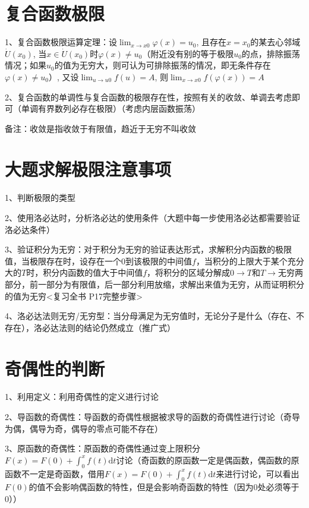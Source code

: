 \section{复合函数极限}

1、复合函数极限运算定理：设$\lim_{x \rightarrow x{0}} \varphi(x)=u_{0}$, 且存在$x=x_{0}$的某去心邻域$\dot{U}\left(x_{0}\right)$, 当$x \in \dot{U}\left(x_{0}\right)$时$\varphi(x) \neq u_{0}$（附近没有别的等于极限$u_{0}$的点，排除振荡情况；如果$u_{0}$的值为无穷大，则可认为可排除振荡的情况，即无条件存在$\varphi(x) \neq u_{0}$）, 又设$\lim_{u \rightarrow u{0}} f(u)=A$, 则$\lim_{x \rightarrow x{0}} f(\varphi(x))=A$

2、复合函数的单调性与复合函数的极限存在性，按照有关的收敛、单调去考虑即可（单调有界数列必存在极限）（考虑内层函数振荡）

备注：收敛是指收敛于有限值，趋近于无穷不叫收敛

\section{大题求解极限注意事项}

1、判断极限的类型

2、使用洛必达时，分析洛必达的使用条件（大题中每一步使用洛必达都需要验证洛必达条件）

3、验证积分为无穷：对于积分为无穷的验证表达形式，求解积分内函数的极限值，当极限存在时，设存在一个$0$到该极限的中间值$f$，当积分的上限大于某个充分大的$T$时，积分内函数的值大于中间值$f$，将积分的区域分解成$0→T$和$T→无穷$两部分，前一部分为有限值，后一部分利用放缩，求解出来值为无穷，从而证明积分的值为无穷<复习全书 P17完整步骤>

4、洛必达法则无穷/无穷型：当分母满足为无穷值时，无论分子是什么（存在、不存在），洛必达法则的结论仍然成立（推广式）

\section{奇偶性的判断}

1、利用定义：利用奇偶性的定义进行讨论

2、导函数的奇偶性：导函数的奇偶性根据被求导的函数的奇偶性进行讨论（奇导为偶，偶导为奇，偶导的零点可能不存在）

3、原函数的奇偶性：原函数的奇偶性通过变上限积分$F(x)=F(0)+\int_{0}^{x} f(t) \mathrm{d} t$讨论（奇函数的原函数一定是偶函数，偶函数的原函数不一定是奇函数，借用$F(x)=F(0)+\int_{0}^{x} f(t) \mathrm{d} t$来进行讨论，可以看出$F(0)$的值不会影响偶函数的特性，但是会影响奇函数的特性（因为0处必须等于0））


